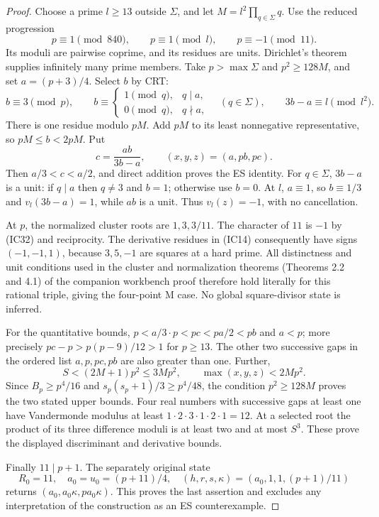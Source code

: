 \begin{proof}
Choose a prime $l\ge13$ outside $\Sigma$, and let $M=l^2\prod_{q\in\Sigma}q$.
Use the reduced progression
\[
 p\equiv1\pmod{840},\qquad p\equiv1\pmod l,\qquad p\equiv-1\pmod{11}.
                                                               \tag{IC32}
\]
Its moduli are pairwise coprime, and its residues are units. Dirichlet's theorem
\cite[Theorem 18.1]{Dirichlet} supplies infinitely many prime members. Take
$p>\max\Sigma$ and $p^2\ge128M$, and set $a=(p+3)/4$. Select $b$ by CRT:
\[
 b\equiv3\pmod p,\qquad
 b\equiv\begin{cases}1\pmod q,&q\mid a,\\0\pmod q,&q\nmid a,\end{cases}
 \quad(q\in\Sigma),
 \qquad 3b-a\equiv l\pmod{l^2}.                         \tag{IC33}
\]
There is one residue modulo $pM$. Add $pM$ to its least nonnegative representative,
so $pM\le b<2pM$. Put
\[
 c=\frac{ab}{3b-a},\qquad (x,y,z)=(a,pb,pc).             \tag{IC34}
\]
Then $a/3<c<a/2$, and direct addition proves the ES identity. For $q\in\Sigma$,
$3b-a$ is a unit: if $q\mid a$ then $q\ne3$ and $b=1$; otherwise use $b=0$.
At $l$, $a\equiv1$, so $b\equiv1/3$ and $v_l(3b-a)=1$, while $ab$ is a unit.
Thus $v_l(z)=-1$, with no cancellation.

At $p$, the normalized cluster roots are $1,3,3/11$. The character of $11$
is $-1$ by (IC32) and reciprocity. The derivative residues in (IC14) consequently
have signs $(-1,-1,1)$, because $3,5,-1$ are squares at a hard prime.
All distinctness and unit conditions used in the cluster and normalization theorems (Theorems 2.2 and 4.1) of the companion workbench proof
therefore hold literally for this rational triple, giving the four-point M case.
No global square-divisor state is inferred.

For the quantitative bounds, $p<a/3\cdot p<pc<p a/2<pb$ and $a<p$; more precisely
$pc-p>p(p-9)/12>1$ for $p\ge13$. The other two successive gaps in the ordered
list $a,p,pc,pb$ are also greater than one. Further,
\[
 S<(2M+1)p^2\le3Mp^2,
 \qquad \max(x,y,z)<2Mp^2.
\]
Since $B_p\ge p^4/16$ and $s_p(s_p+1)/3\ge p^4/48$, the condition
$p^2\ge128M$ proves the two stated upper bounds. Four real numbers with successive
gaps at least one have Vandermonde modulus at least $1\cdot2\cdot3\cdot1\cdot2\cdot1=12$.
At a selected root the product of its three difference moduli is at least two
and at most $S^3$. These prove the displayed discriminant and derivative bounds.

Finally $11\mid p+1$. The separately original state
\[
 R_0=11,\quad a_0=u_0=(p+11)/4,\quad
 (h,r,s,\kappa)=(a_0,1,1,(p+1)/11)
\]
returns $(a_0,a_0\kappa,pa_0\kappa)$. This proves the last assertion and excludes
any interpretation of the construction as an ES counterexample.
\end{proof}

